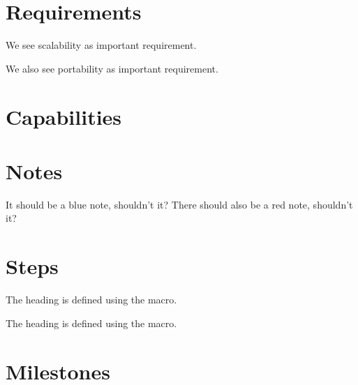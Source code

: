 \documentclass{article}
\begin{document}
\tableofcontents
\clearpage







\section{Requirements}
\label{secreqs}
We see scalability as important requirement.

We also see portability as important requirement.


\section{Capabilities}

\section{Notes}
 It should be a blue note, shouldn't it?
 There should also be a red note, shouldn't it?

\section{Steps}
\label{sec:steps}

\label{sec:rqa}
The heading is defined using the macro.

The heading is defined using the macro.

\section{Milestones}

\clearpage
\end{document}
